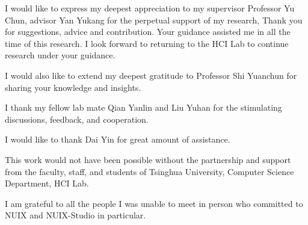 \begin{acknowledgements}

  I would like to express my deepest appreciation to my supervisor Professor Yu Chun, advisor Yan Yukang for the perpetual support of my research, Thank you for suggestions, advice and contribution. Your guidance assisted me in all the time of this research. I look forward to returning to the HCI Lab to continue research under your guidance. 
  
  I would also like to extend my deepest gratitude to Professor Shi Yuanchun for sharing your knowledge and insights. 
  
  I thank my fellow lab mate Qian Yanlin and Liu Yuhan for the stimulating discussions, feedback, and cooperation.
  
  I would like to thank Dai Yin for great amount of assistance.
  
  This work would not have been possible without the partnership and support from the faculty, staff, and students of Tsinghua University, Computer Science Department, HCI Lab. 
  
  I am grateful to all the people I was unable to meet in person who committed to NUIX and NUIX-Studio in particular.
  
\end{acknowledgements}
